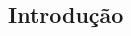 \documentclass{ceel}
\begin{document}
\begin{multicols}{2}
\section{Introdução}

\end{multicols}
\end{document}

